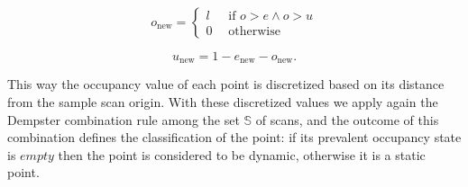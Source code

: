 \begin{equation}
 o_{\text{new}} = \begin{cases}
      l\ \ \ &\mbox{if }o > e \wedge o > u \\
      0 &\mbox{otherwise}
     \end{cases}
\end{equation}

\begin{equation}
 u_{\text{new}} = 1 - e_{\text{new}} - o_{\text{new}}.
\end{equation}

 This way the occupancy value of each point is discretized based on its distance from the sample scan origin. With these discretized values we apply again the Dempster combination rule among the set $\mathbb{S}$ of scans, and the outcome of this combination defines the classification of the point: if its prevalent occupancy state is $empty$ then the point is considered to be dynamic, otherwise it is a static point. 
  
 

